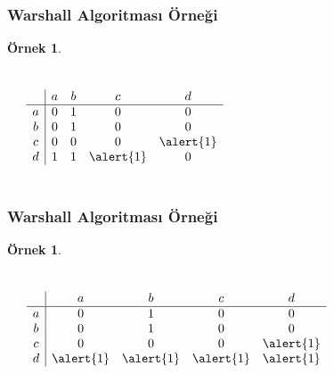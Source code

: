 \documentclass[dvipsnames]{beamer}
\theoremstyle{definition}
\theoremstyle{example}
\newtheorem{ornek}[theorem]{Örnek}
\theoremstyle{plain}
\begin{document}
\begin{frame}
  \frametitle{Warshall Algoritması Örneği}

  \begin{ornek}
    \begin{columns}
      \begin{center}
      \end{center}

      \[
        \begin{array}{c|cccc}
              & a & b & c & d\\\hline
            a & 0 & 1 & 0 & 0\\
            b & 0 & 1 & 0 & 0\\
            c & 0 & 0 & 0 & \alert{1}\\
            d & 1 & 1 & \alert{1} & 0
        \end{array}
      \]
    \end{columns}
  \end{ornek}
\end{frame}

\begin{frame}
  \frametitle{Warshall Algoritması Örneği}

  \begin{ornek}
    \begin{columns}
      \begin{center}
      \end{center}

      \[
        \begin{array}{c|cccc}
              & a & b & c & d\\\hline
            a & 0 & 1 & 0 & 0\\
            b & 0 & 1 & 0 & 0\\
            c & 0 & 0 & 0 & \alert{1}\\
            d & \alert{1} & \alert{1} & \alert{1} & \alert{1}
        \end{array}
      \]
    \end{columns}
  \end{ornek}
\end{frame}
\end{document}
